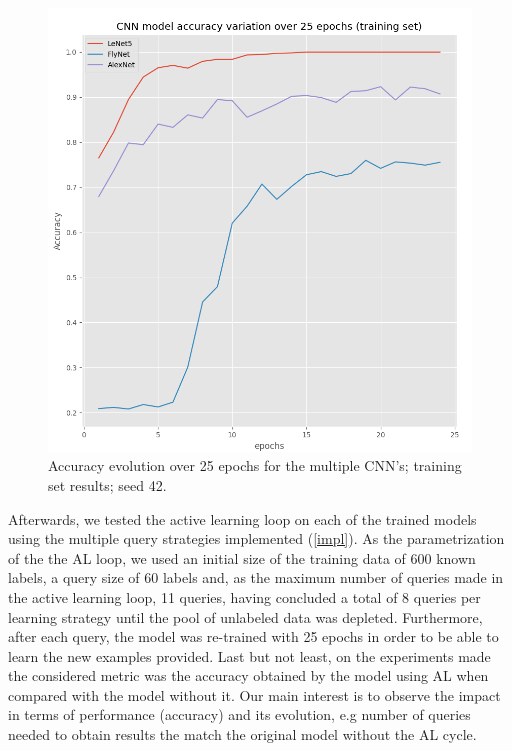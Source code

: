 \documentclass[journal, a4paper]{IEEEtran}
\begin{document}
\begin{figure}[htpb]
    \centering
    \includegraphics[scale=0.4]{CNNAccuracy}
    \caption[CNNAcc]{Accuracy evolution over 25 epochs for the multiple CNN's; 
        training set results; seed 42.}
    \label{CNNAcc}
\end{figure}

Afterwards, we tested the active learning loop on each of the trained models using the
multiple query strategies implemented (\ref{impl}). As the parametrization of the the AL loop,
we used an initial size of the training data of 600 known labels, a query size of 60 labels and, 
as the maximum number of queries made in the active learning loop, 11 queries, having concluded 
a total of 8 queries per learning strategy until the pool of unlabeled data was depleted. 
Furthermore, after each query, the model was re-trained with 25 epochs in order to 
be able to learn the new examples provided. Last but not least, on the experiments made the 
considered metric was the accuracy obtained by the model using AL when compared
with the model without it. Our main interest is to observe the impact in terms of performance
(accuracy) and its evolution, e.g number of queries needed to obtain results the match the original model
without the AL cycle.
\end{document}

